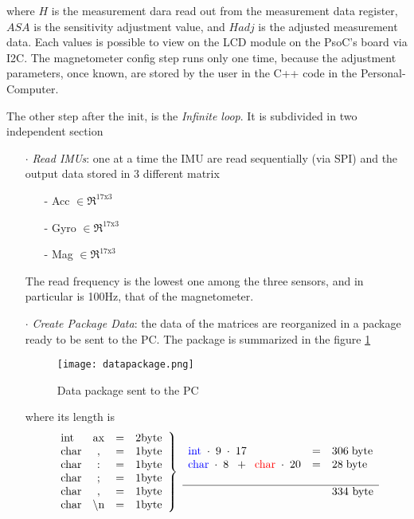 \noindent where $H$ is the measurement dara read out from the measurement data register, $ASA$ is the sensitivity adjustment value, and $Hadj$ is the adjusted measurement data. Each values is possible to view on the LCD module on the PsoC's board via I2C. 
The magnetometer config step runs only one time, because  the adjustment parameters, once known, are stored by the user in the C++ code in the Personal-Computer. 

The other step after the init, is the \textit{Infinite loop}. It is subdivided in two independent section
\begin{enumerate}
\item[$\cdot$] \textit{Read IMUs}: one at a time the IMU are read sequentially (via SPI) and the output data stored in 3 different matrix
                          \begin{enumerate}
                          \item[-] Acc $\in \Re ^{17 \text{x} 3}$
                          \item[-] Gyro $\in \Re ^{17 \text{x} 3}$
                          \item[-] Mag $\in \Re ^{17 \text{x} 3}$
                          \end{enumerate}
                           The read frequency is the lowest one among the three sensors, and in particular is 100Hz, that of the magnetometer.
\item[$\cdot$] \textit{Create Package Data}:  the data of the matrices are reorganized in a package ready to be sent to the PC. The package  is summarized in the figure \ref{fig:package}  
\begin{figure}[h]
\centering
\texttt{[image: datapackage.png]}
\caption{Data package sent to  the PC}
\label{fig:package}
\end{figure}  
 
\noindent where its length is 
\begin{equation*}
\displaystyle  \left. \begin{array}{lccc}
\text{int} & \text{ax} & = & 2 \text{byte} \\
\text{char} & , & = & 1 \text{byte} \\
\text{char} & : & = & 1 \text{byte} \\
\text{char} & ; & = & 1 \text{byte} \\
\text{char} & , & = & 1 \text{byte} \\
\text{char} & \backslash \text{n} & = & 1 \text{byte}
\end{array} \right\rbrace \; 
\begin{array}{lcl}
\textcolor{blue}{\text{int}} \; \cdot \; 9 \; \cdot \; 17 \; & = & 306 \; \text{byte} \\
\textcolor{blue}{\text{char}} \; \cdot \; 8  \; \;+\; \; \textcolor{red}{\text{char}} \; \cdot \; 20  & = & 28 \; \text{byte}  \\ 
& & \\ \hline 
 & & \text{334 byte}
\end{array} 
\end{equation*}


\end{enumerate}
